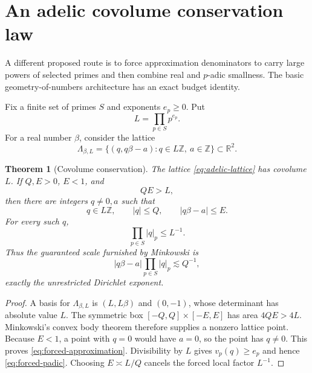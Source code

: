 \documentclass[11pt]{article}
\newtheorem{theorem}{Theorem}[section]
\theoremstyle{definition}
\newcommand{\Z}{\mathbb Z}
\newcommand{\R}{\mathbb R}
\begin{document}
\section{An adelic covolume conservation law}
\label{sec:adelic}

A different proposed route is to force approximation denominators to carry
large powers of selected primes and then combine real and $p$-adic
smallness.  The basic geometry-of-numbers architecture has an exact budget
identity.

Fix a finite set of primes $S$ and exponents $e_p\ge0$.  Put
\begin{equation}
 L=\prod_{p\in S}p^{e_p}.
 \label{eq:L}
\end{equation}
For a real number $\beta$, consider the lattice
\begin{equation}
 \Lambda_{\beta,L}
 =\{(q,q\beta-a):q\in L\Z,\ a\in\Z\}\subset\R^2.
 \label{eq:adelic-lattice}
\end{equation}

\begin{theorem}[Covolume conservation]
\label{thm:covolume}
The lattice \eqref{eq:adelic-lattice} has covolume $L$.  If $Q,E>0$,
$E<1$, and
\begin{equation}
 QE>L,
 \label{eq:minkowski-condition}
\end{equation}
then there are integers $q\ne0,a$ such that
\begin{equation}
 q\in L\Z,
 \qquad |q|\le Q,
 \qquad |q\beta-a|\le E.
 \label{eq:forced-approximation}
\end{equation}
For every such $q$,
\begin{equation}
 \prod_{p\in S}|q|_p\le L^{-1}.
 \label{eq:forced-padic}
\end{equation}
Thus the guaranteed scale furnished by Minkowski is
\begin{equation}
 |q\beta-a|\prod_{p\in S}|q|_p
 \lesssim Q^{-1},
 \label{eq:adelic-conservation}
\end{equation}
exactly the unrestricted Dirichlet exponent.
\end{theorem}

\begin{proof}
A basis for $\Lambda_{\beta,L}$ is $(L,L\beta)$ and $(0,-1)$, whose
determinant has absolute value $L$.  The symmetric box
$[-Q,Q]\times[-E,E]$ has area $4QE>4L$.  Minkowski's convex body theorem
therefore supplies a nonzero lattice point.  Because $E<1$, a point with
$q=0$ would have $a=0$, so the point has $q\ne0$.  This proves
\eqref{eq:forced-approximation}.  Divisibility by $L$ gives
$v_p(q)\ge e_p$ and hence \eqref{eq:forced-padic}.  Choosing
$E\asymp L/Q$ cancels the forced local factor $L^{-1}$.
\end{proof}
\end{document}
